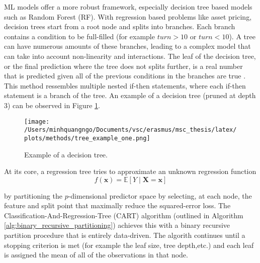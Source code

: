 ML models offer a more robust framework, especially decision tree based models such as Random Forest (RF). With regression based problems like asset pricing, decision trees start from a root node and splits into branches. Each branch contains a condition to be full-filled (for example $turn > 10$ or $turn < 10$). A tree can have numerous amounts of these branches, leading to a complex model that can take into account non-linearity and interactions. The leaf of the decision tree, or the final prediction where the tree does not splits further, is a real number that is predicted given all of the previous conditions in the branches are true \cite{cutler_2012}. This method ressembles multiple nested if-then statements, where each if-then statement is a branch of the tree. An example of a decision tree (pruned at depth 3) can be observed in Figure \cref{fig:decision_tree_viz}.

\begin{figure}[H]
    \centering
    \texttt{[image: /Users/minhquangngo/Documents/vsc/erasmus/msc\_thesis/latex/plots/methods/tree\_example\_one.png]}
    \caption{Example of a decision tree.}
    \label{fig:decision_tree_viz}
\end{figure}

At its core, a regression tree tries to approximate an unknown regression function
\begin{equation}
    \label{eq:regression_tree}
    f(\mathbf{x})
    =
    \mathbb{E}[Y \mid \mathbf{X}=\mathbf{x}]
\end{equation}

by partitioning the $p$-dimensional predictor space  by selecting, at each node, the feature and split point that maximally reduce the squared-error loss. The Classification-And-Regression-Tree (CART) algorithm (outlined in Algorithm \ref{alg:binary_recursive_partitioning}) achieves this with a binary recursive partition procedure that is entirely data-driven. The algorith continues until a stopping criterion is met (for example the leaf size, tree depth,etc.) and each leaf is assigned the mean of all of the observations in that node.

